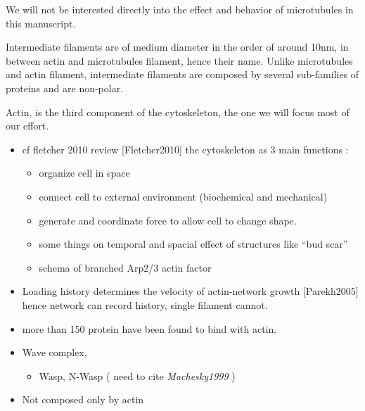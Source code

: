 \documentclass[A4paperpaper,11pt,english]{sphinxmanual}
\begin{document}
We will not be interested directly into the effect and behavior of microtubules in this manuscript.

Intermediate filaments are of medium diameter in the order of around 10nm, in
between actin and microtubules filament, hence their name.  Unlike microtubules
and actin filament, intermediate filaments are composed by several sub-families
of proteins and are non-polar.

Actin, is the third component of the cytoskeleton, the one we will focus most of our effort.
\begin{itemize}
\item {} 
cf fletcher 2010 review {[}Fletcher2010{]} the cytoskeleton as 3 main functions :
\begin{itemize}
\item {} 
organize cell in space

\item {} 
connect cell to external environment (biochemical and mechanical)

\item {} 
generate and coordinate force to allow cell to change shape.

\item {} 
some things on temporal and spacial effect of structures like ``bud scar''

\item {} 
schema of branched Arp2/3 actin factor

\end{itemize}

\item {} 
Loading history determines the velocity of actin-network growth
{[}Parekh2005{]} hence network can record history, single filament
cannot.

\item {} 
more than 150 protein have been found to bind with actin.

\item {} 
Wave complex,
\begin{itemize}
\item {} 
Wasp, N-Wasp ( need to cite \emph{Machesky1999} )

\end{itemize}

\item {} 
Not composed only by actin

\end{itemize}
\end{document}
